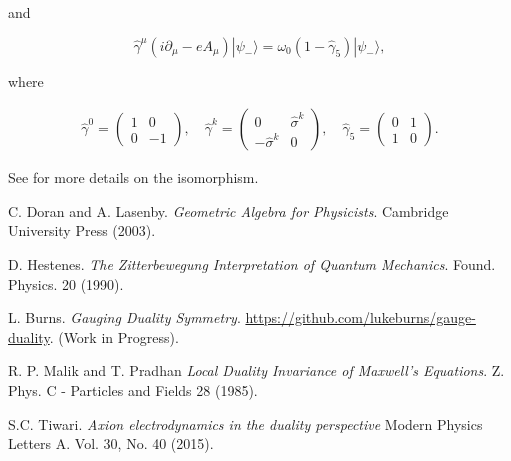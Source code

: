 \documentclass{article}
\begin{document}
  and

  \begin{equation}
    \hat \gamma^\mu (i \partial_\mu - e A_\mu) | \psi_- \rangle = \omega_0 (1 - \hat \gamma_5) | \psi_- \rangle,
  \end{equation}

  where

  \begin{align}
    \hat \gamma^0 = \begin{pmatrix} 1 & 0 \\ 0 & -1 \end{pmatrix},\quad \hat \gamma^k = \begin{pmatrix} 0 & \hat \sigma^k \\ -\hat \sigma^k & 0 \end{pmatrix},\quad \hat \gamma_5 = \begin{pmatrix} 0 & 1 \\ 1 & 0 \end{pmatrix}.
  \end{align}

  See \cite{gap} for more details on the isomorphism.

  \begin{thebibliography}{9}
      C. Doran and A. Lasenby.
      \emph{Geometric Algebra for Physicists}. Cambridge University Press (2003).

      D. Hestenes.
      \emph{The Zitterbewegung Interpretation of Quantum Mechanics}.
      Found. Physics. 20 (1990).

      L. Burns.
      \emph{Gauging Duality Symmetry}.
      \url{https://github.com/lukeburns/gauge-duality}. (Work in Progress).

      R. P. Malik and T. Pradhan 
      \emph{Local Duality Invariance of Maxwell's Equations}.
      Z. Phys. C - Particles and Fields 28 (1985).

      S.C. Tiwari.
      \emph{Axion electrodynamics in the duality perspective}
      Modern Physics Letters A.
      Vol. 30, No. 40 (2015).

  \end{thebibliography}
\end{document}
